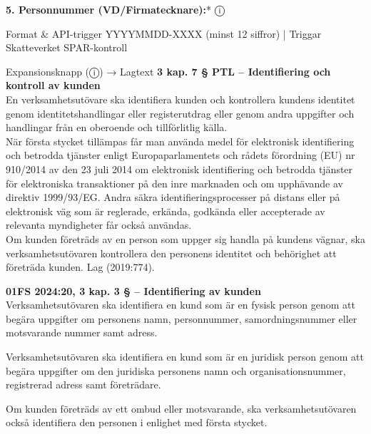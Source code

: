 \documentclass[10pt]{beamer}
\begin{document}
\begin{frame}[label=riskfragor-steg1]
 
  \textbf{5. Personnummer (VD/Firmatecknare):}* \underline{\hspace{4cm}} \hspace{0.3cm} ⓘ
  \begin{block}{Format \& API-trigger}
    \tiny YYYYMMDD-XXXX (minst 12 siffror) | Triggar Skatteverket SPAR-kontroll
  \end{block}
  \begin{alertblock}{Expansionsknapp (ⓘ) → Lagtext}
    \tiny \textbf{3 kap. 7 §  PTL – Identifiering och kontroll av kunden}\\
    \tiny En verksamhetsutövare ska identifiera kunden och kontrollera kundens identitet
     genom identitetshandlingar eller registerutdrag eller genom andra uppgifter och handlingar
     från en oberoende och tillförlitlig källa.\\

    \tiny När första stycket tillämpas får man använda medel för elektronisk identifiering och
     betrodda tjänster enligt Europaparlamentets och rådets förordning (EU) nr 910/2014 av den
     23 juli 2014 om elektronisk identifiering och betrodda tjänster för elektroniska transaktioner
     på den inre marknaden och om upphävande av direktiv 1999/93/EG. Andra säkra identifieringsprocesser 
     på distans eller på elektronisk väg som är reglerade, erkända, godkända eller accepterade av 
     relevanta myndigheter får också användas.\\

    \tiny Om kunden företräds av en person som uppger sig handla på kundens vägnar, ska verksamhetsutövaren
     kontrollera den personens identitet och behörighet att företräda kunden. Lag (2019:774).
     \vspace{0.1cm}
    
    \tiny \textbf{01FS 2024:20, 3 kap. 3 §  – Identifiering av kunden}\\
    \tiny Verksamhetsutövaren ska identifiera en kund som är en fysisk person genom att begära
     uppgifter om personens namn, personnummer, samordningsnummer eller motsvarande nummer samt adress.

    \tiny Verksamhetsutövaren ska identifiera en kund som är en juridisk person genom att begära
     uppgifter om den juridiska personens namn och organisationsnummer, registrerad adress samt företrädare.

    \tiny Om kunden företräds av ett ombud eller motsvarande, ska verksamhetsutövaren
     också identifiera den personen i enlighet med första stycket.
    \vspace{0.1cm}
    

\end{alertblock}
\end{frame}
\end{document}
